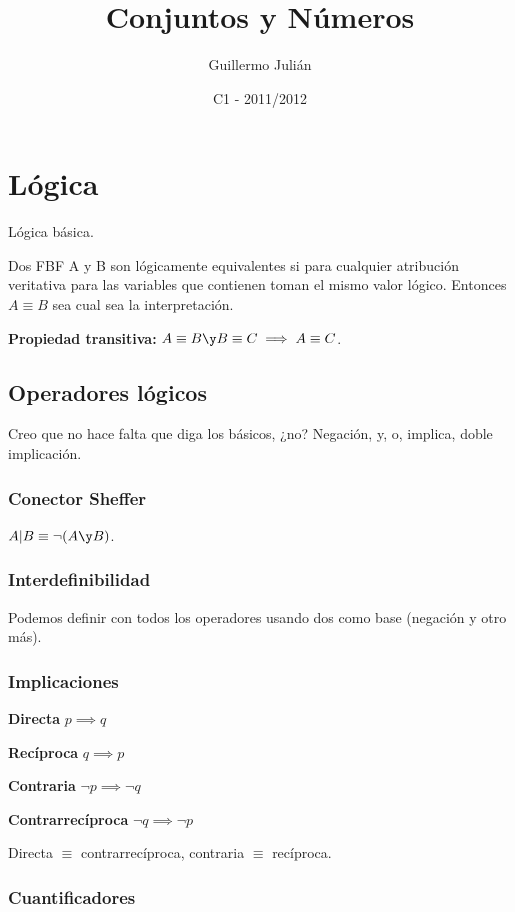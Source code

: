 \documentclass[nochap]{apuntes}
\author{Guillermo Julián}
\date{C1 - 2011/2012}
\title{Conjuntos y Números}
\begin{document}
\pagestyle{plain}
\maketitle
\newpage

\section{Lógica}
Lógica básica.
\begin{defn}
Dos FBF A y B son lógicamente equivalentes si para cualquier atribución veritativa para las variables que contienen toman el mismo valor lógico. Entonces $A\equiv B$ sea cual sea la interpretación.

\textbf{Propiedad transitiva:} $A\equiv B \y B\equiv C \implies A\equiv C$.
\end{defn}

\subsection{Operadores lógicos}
Creo que no hace falta que diga los básicos, ¿no? Negación, y, o, implica, doble implicación. 

\subsubsection*{Conector Sheffer} $A|B\equiv \neg (A \y B)$.

\subsubsection{Interdefinibilidad} Podemos definir con todos los operadores usando dos como base (negación y otro más).

\subsubsection{Implicaciones}
\textbf{Directa} $p\implies q$

\textbf{Recíproca}  $q \implies p$

\textbf{Contraria} $\neg p \implies \neg q$

\textbf{Contrarrecíproca}  $\neg q \implies \neg p$

\indent

Directa $\equiv$ contrarrecíproca, contraria $\equiv$ recíproca.

\subsubsection{Cuantificadores}
\end{document}
